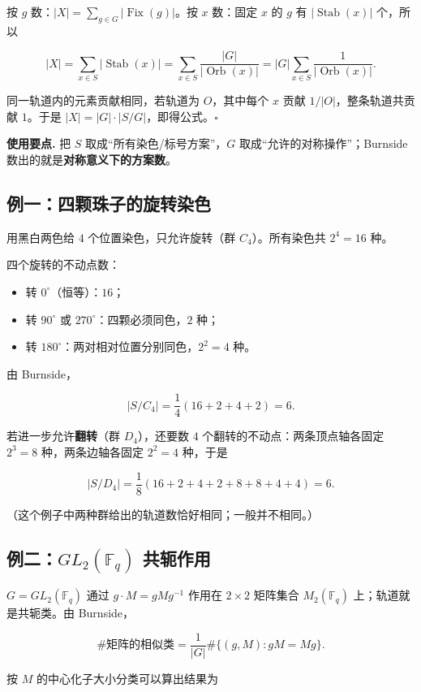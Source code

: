 按 $g$ 数：$|X|=\sum_{g\in G}|\operatorname{Fix}(g)|$。按 $x$ 数：固定 $x$ 的 $g$ 有 $|\operatorname{Stab}(x)|$ 个，所以

\[
|X|=\sum_{x\in S}|\operatorname{Stab}(x)|
=\sum_{x\in S}\frac{|G|}{|\operatorname{Orb}(x)|}
=|G|\sum_{x\in S}\frac{1}{|\operatorname{Orb}(x)|}.
\]

同一轨道内的元素贡献相同，若轨道为 $O$，其中每个 $x$ 贡献 $1/|O|$，整条轨道共贡献 $1$。于是 $|X|=|G|\cdot|S/G|$，即得公式。$\square$

\textbf{使用要点.} 把 $S$ 取成“所有染色/标号方案”，$G$ 取成“允许的对称操作”；Burnside 数出的就是\textbf{对称意义下的方案数}。

\subsection{例一：四颗珠子的旋转染色}


用黑白两色给 $4$ 个位置染色，只允许旋转（群 $C_4$）。所有染色共 $2^4=16$ 种。

四个旋转的不动点数：

\begin{itemize}
\item 转 $0^\circ$（恒等）：$16$；
\item 转 $90^\circ$ 或 $270^\circ$：四颗必须同色，$2$ 种；
\item 转 $180^\circ$：两对相对位置分别同色，$2^2=4$ 种。
\end{itemize}


由 Burnside，

\[
|S/C_4|=\frac{1}{4}(16+2+4+2)=6.
\]

若进一步允许\textbf{翻转}（群 $D_4$），还要数 $4$ 个翻转的不动点：两条顶点轴各固定 $2^3=8$ 种，两条边轴各固定 $2^2=4$ 种，于是

\[
|S/D_4|=\frac{1}{8}(16+2+4+2+8+8+4+4)=6.
\]

（这个例子中两种群给出的轨道数恰好相同；一般并不相同。）

\subsection{例二：$GL_2(\mathbb F_q)$ 共轭作用}


$G=GL_2(\mathbb F_q)$ 通过 $g\cdot M=gMg^{-1}$ 作用在 $2\times2$ 矩阵集合 $M_2(\mathbb F_q)$ 上；轨道就是共轭类。由 Burnside，

\[
\#\text{矩阵的相似类}
=\frac{1}{|G|}\#\{(g,M):gM=Mg\}.
\]

按 $M$ 的中心化子大小分类可以算出结果为

